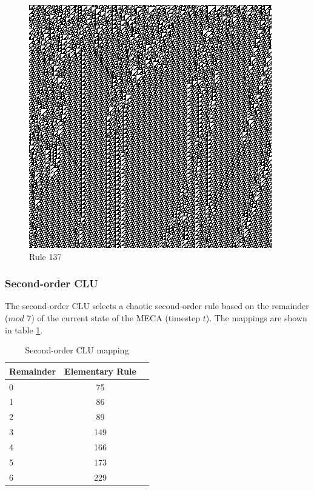 \documentclass{article}
\begin{document}
\begin{figure}[H]
	\caption{Rule 137}
	\label{fig:figure3}
	\centering
	\includegraphics[scale=.75]{137.png}
\end{figure}


\subsubsection{Second-order CLU}

The second-order CLU selects a chaotic second-order rule based on the remainder ($mod$ 7) of the current state of the MECA (timestep $t$). The mappings are shown in table \ref{tab:table2}.

\begin{table}[h!]
  \begin{center}
    \caption{Second-order CLU mapping}
    \label{tab:table2}
    \begin{tabular}{l|c|r} %
      \textbf{Remainder} & \textbf{Elementary Rule}\\
      \hline
      0 & 75\\
      1 & 86\\
      2 & 89\\
      3 & 149\\
      4 & 166\\
      5 & 173\\
      6 & 229\\
    \end{tabular}
  \end{center}
\end{table}
\end{document}
